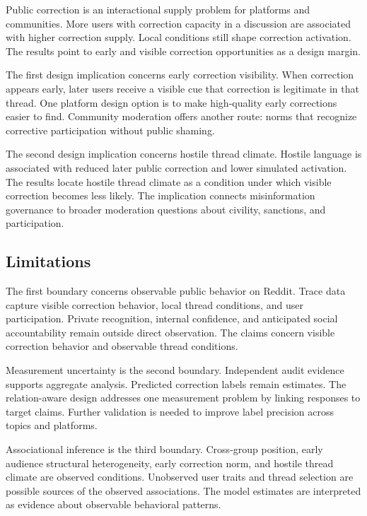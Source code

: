 \documentclass[namedate,unnumsec,webpdf,contemporary,large]{oup-authoring-template}
\begin{document}
Public correction is an interactional supply problem for platforms and communities. More users with correction capacity in a discussion are associated with higher correction supply. Local conditions still shape correction activation. The results point to early and visible correction opportunities as a design margin.

The first design implication concerns early correction visibility. When correction appears early, later users receive a visible cue that correction is legitimate in that thread. One platform design option is to make high-quality early corrections easier to find. Community moderation offers another route: norms that recognize corrective participation without public shaming.

The second design implication concerns hostile thread climate. Hostile language is associated with reduced later public correction and lower simulated activation. The results locate hostile thread climate as a condition under which visible correction becomes less likely. The implication connects misinformation governance to broader moderation questions about civility, sanctions, and participation.

\subsection{Limitations}


The first boundary concerns observable public behavior on Reddit. Trace data capture visible correction behavior, local thread conditions, and user participation. Private recognition, internal confidence, and anticipated social accountability remain outside direct observation. The claims concern visible correction behavior and observable thread conditions.

Measurement uncertainty is the second boundary. Independent audit evidence supports aggregate analysis. Predicted correction labels remain estimates. The relation-aware design addresses one measurement problem by linking responses to target claims. Further validation is needed to improve label precision across topics and platforms.

Associational inference is the third boundary. Cross-group position, early audience structural heterogeneity, early correction norm, and hostile thread climate are observed conditions. Unobserved user traits and thread selection are possible sources of the observed associations. The model estimates are interpreted as evidence about observable behavioral patterns.
\end{document}
